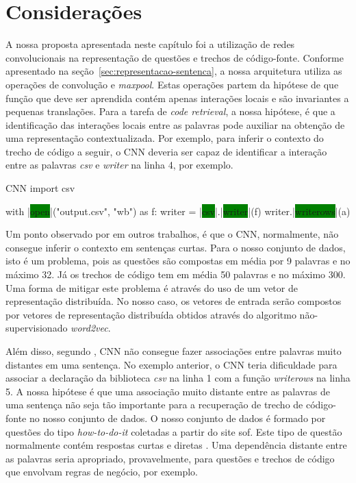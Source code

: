 \section{Considerações}

A nossa proposta apresentada neste capítulo foi a utilização de redes convolucionais na representação de questões e trechos de código-fonte. Conforme apresentado na seção~\ref{sec:representacao-sentenca}, a nossa arquitetura utiliza as operações de convolução e \textit{maxpool}. Estas operações partem da hipótese de que função que deve ser aprendida contém apenas interações locais e são invariantes a pequenas translações. Para a tarefa de \textit{code retrieval}, a nossa hipótese, é que a identificação das interações locais entre as palavras pode auxiliar na obtenção de uma representação contextualizada. Por exemplo, para inferir o contexto do trecho de código a seguir, o CNN deveria ser capaz de identificar a interação entre as palavras \emph{csv} e \emph{writer} na linha 4, por exemplo. 

\begin{mypython-linenumber}{CNN}
import csv

with |\colorbox{green}{open}|("output.csv", "wb") as f:
    writer = |\colorbox{green}{csv}|.|\colorbox{green}{writer}|(f)
    writer.|\colorbox{green}{writerows}|(a)
\end{mypython-linenumber}

Um ponto observado por \cite{tom-young:trends-deep-learning-nlp} em outros trabalhos, é que o CNN, normalmente, não consegue inferir o contexto em sentenças curtas. Para o nosso conjunto de dados, isto é um problema, pois as questões são compostas em média por 9 palavras e no máximo 32. Já os trechos de código tem em média 50 palavras e no máximo 300. Uma forma de mitigar este problema é através do uso de um vetor de representação distribuída. No nosso caso, os vetores de entrada serão compostos por vetores de representação distribuída obtidos através do algoritmo não-supervisionado \textit{word2vec}.

Além disso, segundo \cite{Goodfellow-et-al-2016:convolutional-networks}, CNN não consegue fazer associações entre palavras muito distantes em uma sentença. No exemplo anterior, o CNN teria dificuldade para associar a declaração da biblioteca \emph{csv} na linha 1 com a função \emph{writerows} na linha 5. A nossa hipótese é que uma associação muito distante entre as palavras de uma sentença não seja tão importante para a recuperação de trecho de código-fonte no nosso conjunto de dados. O nosso conjunto de dados é formado por questões do tipo \textit{how-to-do-it} coletadas a partir do site \gls{sof}. Este tipo de questão normalmente contém respostas curtas e diretas  \citep{yao-2018}. Uma dependência distante entre as palavras seria apropriado, provavelmente, para questões e trechos de código que envolvam regras de negócio, por exemplo.


